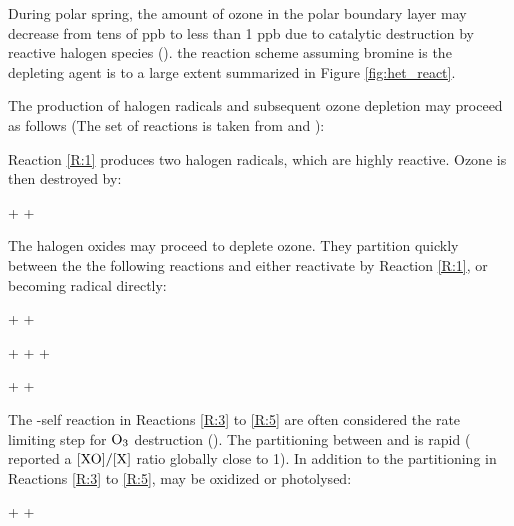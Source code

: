 \medskip

During polar spring, the amount of ozone in the polar boundary layer may decrease from tens of ppb to less than 1 ppb due to catalytic destruction by reactive halogen species (\cite{CAO}). the reaction scheme assuming bromine is the depleting agent is to a large extent summarized in Figure \ref{fig:het_react}. 

\medskip



The production of halogen radicals and subsequent ozone depletion may proceed as follows (The set of reactions is taken from \cite{CAO} and \cite{Simpson2015}): 

\medskip

Reaction \ref{R:1} produces two halogen radicals, which are highly reactive. Ozone is then destroyed by: 

\begin{reaction}
     +  \rightarrow {} + 
    \label{R:2}
\end{reaction}

The halogen oxides may proceed to deplete ozone. They partition quickly between the the following reactions and either reactivate by Reaction \ref{R:1}, or becoming radical directly:


\begin{reaction}
     +  \rightarrow {} +  \label{R:3} 
\end{reaction}


\begin{reaction}
     +  \rightarrow {} +  +  \label{R:4} 
\end{reaction}


\begin{reaction}
     +  \rightarrow {} +  \label{R:5} 
\end{reaction}

The -self reaction in Reactions \ref{R:3} to \ref{R:5} are often considered the rate limiting step for $\mathrm{O_3}$ destruction (\cite{JPL}). The partitioning between  and  is rapid (\cite{Schmidt} reported a $[\mathrm{XO}]/[\mathrm{X}]$ ratio globally close to 1). In addition to the partitioning in Reactions \ref{R:3} to \ref{R:5},  may be oxidized or photolysed:  

\begin{reaction}
     +  \rightarrow {} + 
    \label{R:15}
\end{reaction}

